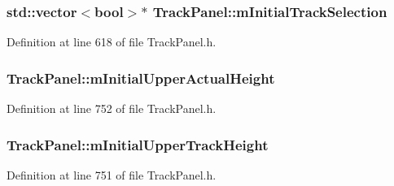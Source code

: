 \subsubsection[{\texorpdfstring{m\+Initial\+Track\+Selection}{mInitialTrackSelection}}]{\setlength{\rightskip}{0pt plus 5cm}std\+::vector$<${\bf bool}$>$$\ast$ Track\+Panel\+::m\+Initial\+Track\+Selection\hspace{0.3cm}{\ttfamily [protected]}}\hypertarget{class_track_panel_a2040148c3f847c66400e829f65eb9397}{}\label{class_track_panel_a2040148c3f847c66400e829f65eb9397}


Definition at line 618 of file Track\+Panel.\+h.

\subsubsection[{\texorpdfstring{m\+Initial\+Upper\+Actual\+Height}{mInitialUpperActualHeight}}]{ Track\+Panel\+::m\+Initial\+Upper\+Actual\+Height\hspace{0.3cm}{\ttfamily [protected]}}\hypertarget{class_track_panel_aeeb50d3d2469be1829175425b1dc58c3}{}\label{class_track_panel_aeeb50d3d2469be1829175425b1dc58c3}


Definition at line 752 of file Track\+Panel.\+h.

\subsubsection[{\texorpdfstring{m\+Initial\+Upper\+Track\+Height}{mInitialUpperTrackHeight}}]{ Track\+Panel\+::m\+Initial\+Upper\+Track\+Height\hspace{0.3cm}{\ttfamily [protected]}}\hypertarget{class_track_panel_ad8dad5601fc0fdaaa4b59ec6598caa16}{}\label{class_track_panel_ad8dad5601fc0fdaaa4b59ec6598caa16}


Definition at line 751 of file Track\+Panel.\+h.

